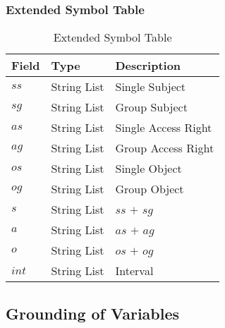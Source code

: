 \documentclass[11pt]{report}
\begin{document}
         \subsubsection{Extended Symbol Table}

          \begin{table}[tbhp]
            \begin{center}
              \begin{tabular}[t]{|l|l|l|}
                \hline
                {\bf Field} & {\bf Type} & {\bf Description} \\
                \hline
                $ss$  & String List & Single Subject \\
                \hline
                $sg$  & String List & Group Subject \\
                \hline
                $as$  & String List & Single Access Right \\
                \hline
                $ag$  & String List & Group Access Right \\
                \hline
                $os$  & String List & Single Object \\
                \hline
                $og$  & String List & Group Object \\
                \hline
                $s$   & String List & $ss$ $+$ $sg$ \\
                \hline
                $a$   & String List & $as$ $+$ $ag$ \\
                \hline
                $o$   & String List & $os$ $+$ $og$ \\
                \hline
                $int$ & String List & Interval \\
                \hline
              \end{tabular}
            \end{center}
            \caption{Extended Symbol Table}
            \label{tabl-impln-symtb}
          \end{table}

      \subsection{Grounding of Variables}
        \label{subs-impln-grndg}
\end{document}
